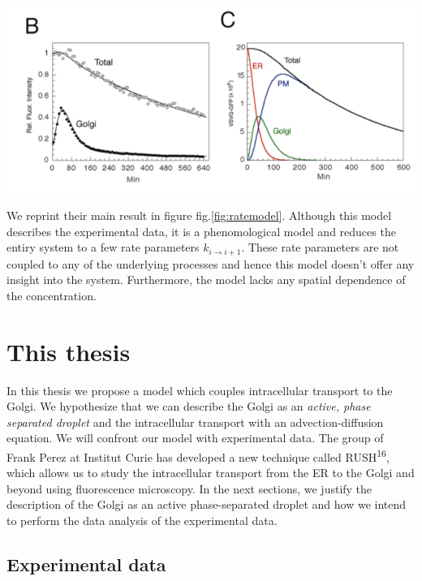 \documentclass{Dissertate}
\let\origfigure\figure
\let\endorigfigure\endfigure
\renewenvironment{figure}[1][2] {
    \expandafter\origfigure\expandafter[H]
} {
    \endorigfigure
}
\begin{document}
\begin{figure}
\hypertarget{fig:ratemodel}{%
\centering
\includegraphics{source/figures/png/kineticmodel.png}
\caption{\textbf{Left panel}: First order rate model fitted to
experimental data by 15 \textbf{Right panel}: Inferred concentration in
ER, Golgi and PM using the fitted parameters from the left panel and
their model. Image reprinted from 15.}\label{fig:ratemodel}
}
\end{figure}

We reprint their main result in figure fig.\ref{fig:ratemodel}.
Although this model describes the experimental data, it is a
phenomological model and reduces the entiry system to a few rate
parameters \(k_{i\to i+1}\). These rate parameters are not coupled to
any of the underlying processes and hence this model doesn't offer any
insight into the system. Furthermore, the model lacks any spatial
dependence of the concentration.

\hypertarget{this-thesis}{%
\section{This thesis}\label{this-thesis}}

In this thesis we propose a model which couples intracellular transport
to the Golgi. We hypothesize that we can describe the Golgi as an
\emph{active, phase separated droplet} and the intracellular transport
with an advection-diffusion equation. We will confront our model with
experimental data. The group of Frank Perez at Institut Curie has
developed a new technique called RUSH\textsuperscript{16}, which allows
us to study the intracellular transport from the ER to the Golgi and
beyond using fluorescence microscopy. In the next sections, we justify
the description of the Golgi as an active phase-separated droplet and
how we intend to perform the data analysis of the experimental data.

\hypertarget{experimental-data}{%
\subsection{Experimental data}\label{experimental-data}}
\end{document}
